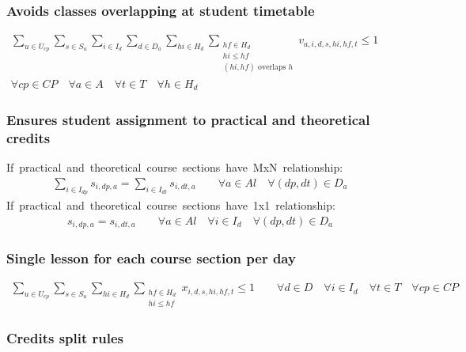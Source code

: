 \subsubsection{Avoids classes overlapping at student timetable}
\begin{eqnarray}
\sum\limits_{u \in U_{cp}} \sum\limits_{s \in S_{u}} \sum\limits_{i \in I_{d}} \sum\limits_{d \in D_{a}} \sum\limits_{hi \in H_{d}} \sum_{\substack {hf \in H_{d} \\ hi\le hf \\ (hi,hf)\mbox{ overlaps }h}} v_{a,i,d,s,hi,hf,t}  \leq  1  \nonumber \qquad 
\\
\forall cp \in CP \quad
\forall a \in A \quad
\forall t \in T \quad
\forall h \in H_{d}
\end{eqnarray}

\subsubsection{Ensures student assignment to practical and theoretical credits}
\mbox{If practical and theoretical course sections have MxN relationship:}
\begin{eqnarray}
\sum\limits_{i \in I_{dp}} s_{i,dp,a} = \sum\limits_{ i \in I_{dt} } s_{i,dt,a} \nonumber \qquad 
\forall a \in Al \quad
\forall (dp,dt) \in D_{a} \quad
\end{eqnarray}
\mbox{If practical and theoretical course sections have 1x1 relationship:}
\begin{eqnarray}
s_{i,dp,a} = s_{i,dt,a} \nonumber \qquad 
\forall a \in Al \quad
\forall i \in I_{d} \quad
\forall (dp,dt) \in D_{a} \quad
\end{eqnarray}

\subsubsection{Single lesson for each course section per day}
\begin{eqnarray}
\sum\limits_{u \in U_{cp}} \sum\limits_{s \in S_{u}} \sum\limits_{hi \in H_{d}} \sum_{\substack {hf \in H_{d} \\ hi\le hf}} x_{i,d,s,hi,hf,t}  \leq  1  \nonumber \qquad 
\forall d \in D \quad
\forall i \in I_{d} \quad
\forall t \in T \quad
\forall cp \in CP 
\end{eqnarray}



\subsubsection{Credits split rules}

